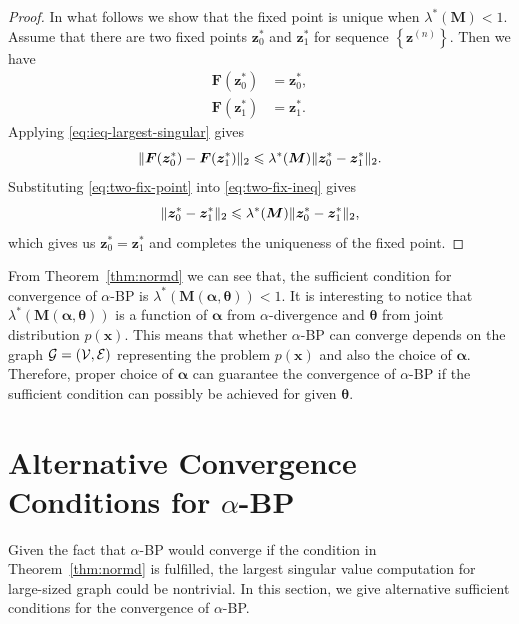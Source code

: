 \begin{proof}
  In what follows we show that the fixed point is unique when $\lambda^{\ast}(\bm{M})<1$. Assume that there are two fixed points $\bm{z}_0^{\ast}$ and $\bm{z}_1^{\ast}$ for sequence $\left\{ \bm{z}^{(n)} \right\}$. Then we have
  \begin{align}\label{eq:two-fix-point}
    \bm{F}(\bm{z}_0^{\ast}) &= \bm{z}_0^{\ast}, \nonumber\\
    \bm{F}(\bm{z}_1^{\ast}) &= \bm{z}_1^{\ast}. 
  \end{align}
  Applying \eqref{eq:ieq-largest-singular} gives
  \begin{equation}\label{eq:two-fix-ineq}
    \| \bm{F}(\bm{z}_0^{\ast}) - \bm{F}(\bm{z}_1^{\ast}) \|_{2} \leqslant
    \lambda^{\ast}(\bm{M})\| \bm{z}_0^{\ast} - \bm{z}_1^{\ast} \|_{2}.
  \end{equation}
  Substituting \eqref{eq:two-fix-point} into \eqref{eq:two-fix-ineq}
  gives
  \begin{equation}
    \| \bm{z}_0^{\ast} - \bm{z}_1^{\ast} \|_{2} \leqslant
    \lambda^{\ast}(\bm{M})\| \bm{z}_0^{\ast} - \bm{z}_1^{\ast} \|_{2},
  \end{equation}
  which gives us $\bm{z}_0^{\ast} = \bm{z}_1^{\ast}$ and completes the uniqueness of the fixed point.
\end{proof}

\begin{remark}
  From Theorem~\ref{thm:normd} we can see that, the sufficient condition for convergence of $\alpha$-BP is $\lambda^{\ast}(\bm{M}(\bm{\alpha}, \bm{\theta})) < 1$. It is interesting to notice that $\lambda^{\ast}(\bm{M}(\bm{\alpha}, \bm{\theta}))$ is a function of $\bm{\alpha}$ from $\alpha$-divergence and $\bm{\theta}$ from joint distribution $p(\bm{x})$. This means that whether $\alpha$-BP can converge depends on the graph $\mathcal{G}= (\mathcal{V}, \mathcal{E})$ representing the problem $p(\bm{x})$ and also the choice of $\bm{\alpha}$. Therefore, proper choice of $\bm{\alpha}$ can guarantee the convergence of $\alpha$-BP if the sufficient condition can possibly be achieved for given $\bm{\theta}$.
\end{remark}

\section{Alternative Convergence Conditions for $\alpha$-BP}\label{sec:cvng-coro}
Given the fact that $\alpha$-BP would converge if the condition in Theorem~\ref{thm:normd} is fulfilled, the largest singular value computation for large-sized graph could be nontrivial. In this section, we give alternative sufficient conditions for the convergence of $\alpha$-BP.

